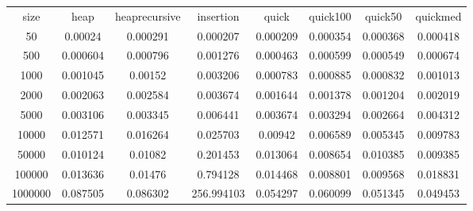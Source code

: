 \begin{table}
\begin{tabular}{cccccccc}
size & heap & heaprecursive & insertion & quick & quick100 & quick50 & quickmed \\
50 & 0.00024 & 0.000291 & 0.000207 & 0.000209 & 0.000354 & 0.000368 & 0.000418 \\
500 & 0.000604 & 0.000796 & 0.001276 & 0.000463 & 0.000599 & 0.000549 & 0.000674 \\
1000 & 0.001045 & 0.00152 & 0.003206 & 0.000783 & 0.000885 & 0.000832 & 0.001013 \\
2000 & 0.002063 & 0.002584 & 0.003674 & 0.001644 & 0.001378 & 0.001204 & 0.002019 \\
5000 & 0.003106 & 0.003345 & 0.006441 & 0.003674 & 0.003294 & 0.002664 & 0.004312 \\
10000 & 0.012571 & 0.016264 & 0.025703 & 0.00942 & 0.006589 & 0.005345 & 0.009783 \\
50000 & 0.010124 & 0.01082 & 0.201453 & 0.013064 & 0.008654 & 0.010385 & 0.009385 \\
100000 & 0.013636 & 0.01476 & 0.794128 & 0.014468 & 0.008801 & 0.009568 & 0.018831 \\
1000000 & 0.087505 & 0.086302 & 256.994103 & 0.054297 & 0.060099 & 0.051345 & 0.049453 \\
\end{tabular}
\end{table}
